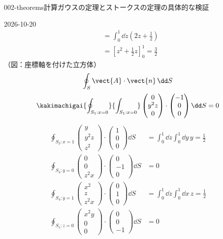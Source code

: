 \documentclass[uplatex,dvipdfmx,a4paper,11pt]{jsarticle}
\begin{document}
\begin{mondai}{002-theorems}{計算}{ガウスの定理とストークスの定理の具体的な検証}
\begin{kotaeutsushi}{2026-10-20}
\begin{align*}
&=\int_{0}^{1}\dd z\left(2z+\frac{1}{2}\right)\\
&=\left[z^{2}+\frac{1}{2}z\right]_{0}^{1}=\frac{3}{2}
\end{align*}
（図：座標軸を付けた立方体）
\[ \oint_{S}\vect{A}\cdot\vect{n}\,\dd S \]
\[ \kakimachigai{\oint_{S_{1}:x=0}}{\int_{S_{1}:x=0}}\begin{pmatrix}0\\y^{2}z\\0\end{pmatrix}\cdot\begin{pmatrix}-1\\0\\0\end{pmatrix}\dd S=0 \]
\begin{align*}
\oint_{S_{2}:x=1}\begin{pmatrix}y\\y^{2}z\\z^{2}\end{pmatrix}\cdot\begin{pmatrix}1\\0\\0\end{pmatrix}\dd S&=\int_{0}^{1}\dd z\int_{0}^{1}\dd y\,y=\frac{1}{2}\\
\oint_{S_{3}:y=0}\begin{pmatrix}0\\0\\z^{2}x\end{pmatrix}\cdot\begin{pmatrix}0\\-1\\0\end{pmatrix}\dd S&=0\\
\oint_{S_{4}:y=1}\begin{pmatrix}x^{2}\\z\\z^{2}x\end{pmatrix}\cdot\begin{pmatrix}0\\1\\0\end{pmatrix}\dd S&=\int_{0}^{1}\dd z\int_{0}^{1}\dd x\,z=\frac{1}{2}\\
\oint_{S_{5}:z=0}\begin{pmatrix}x^{2}y\\0\\0\end{pmatrix}\cdot\begin{pmatrix}0\\0\\-1\end{pmatrix}\dd S&=0\\

\end{align*}
\end{kotaeutsushi}
\end{mondai}
\end{document}
